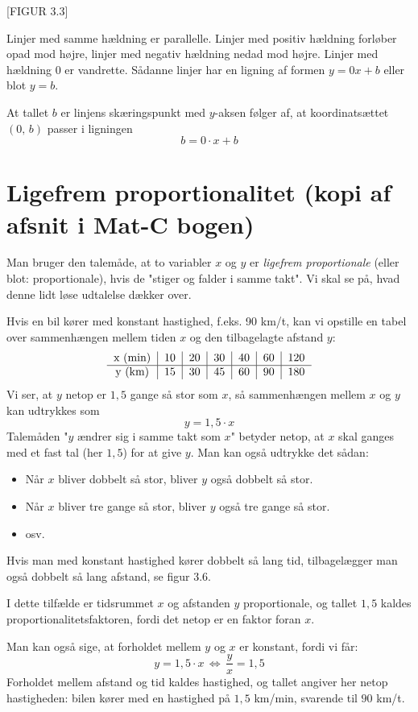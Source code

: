\documentclass[12pt,oneside,a4paper]{article}
\begin{document}
[FIGUR 3.3]

Linjer med samme hældning er parallelle. Linjer med positiv hældning forløber
opad mod højre, linjer med negativ hældning nedad mod højre. Linjer med
hældning 0 er vandrette.  Sådanne linjer har en ligning af formen $y=0x+b$
eller blot $y=b$.

At tallet $b$ er linjens skæringspunkt med $y$-aksen følger af, at
koordinatsættet $(0,\,b)$ passer i ligningen
$$
b = 0\cdot x+b
$$

\section{Ligefrem proportionalitet (kopi af afsnit i Mat-C bogen)}
Man bruger den talemåde, at to variabler $x$ og $y$ er {\em ligefrem
proportionale} (eller blot: proportionale), hvis de "stiger og falder i samme
takt". Vi skal se på, hvad denne lidt løse udtalelse dækker over.

Hvis en bil kører med konstant hastighed, f.eks. 90 km/t, kan vi opstille en
tabel over sammenhængen mellem tiden $x$ og den tilbagelagte afstand $y$:
$$
\begin{tabular}{c|c|c|c|c|c|c}
    x ({\rm min}) & 10 & 20 & 30 & 40 & 60 & 120 \\
    \hline
    y ({\rm km})  & 15 & 30 & 45 & 60 & 90 & 180  
\end{tabular}
$$
Vi ser, at $y$ netop er $1,5$ gange så stor som $x$, så sammenhængen mellem $x$
og $y$ kan udtrykkes som
$$
y = 1,5\cdot x
$$
Talemåden "$y$ ændrer sig i samme takt som $x$" betyder netop, at $x$ skal
ganges med et fast tal (her $1,5$) for at give $y$. Man kan også udtrykke det
sådan:
\begin{itemize}
    \item Når $x$ bliver dobbelt så stor, bliver $y$ også dobbelt så stor.
    \item Når $x$ bliver tre gange så stor, bliver $y$ også tre gange så stor.
    \item osv.
\end{itemize}
Hvis man med konstant hastighed kører dobbelt så lang tid, tilbagelægger man
også dobbelt så lang afstand, se figur 3.6.

I dette tilfælde er tidsrummet $x$ og afstanden $y$ proportionale, og tallet
$1,5$ kaldes proportionalitetsfaktoren, fordi det netop er en faktor foran $x$.

Man kan også sige, at forholdet mellem $y$ og $x$ er konstant, fordi vi får:
$$
y = 1,5\cdot x \, \Leftrightarrow \, \frac{y}{x} = 1,5
$$
Forholdet mellem afstand og tid kaldes hastighed, og tallet angiver her netop
hastigheden: bilen kører med en hastighed på $1,5$ km/min, svarende til $90$
km/t.
\end{document}
